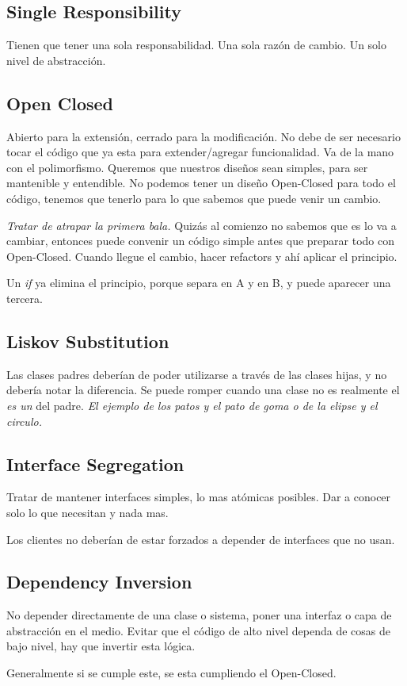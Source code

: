 \subsection*{Single Responsibility}
Tienen que tener una sola responsabilidad. Una sola razón de cambio. Un solo nivel de abstracción.

\subsection*{Open Closed}
Abierto para la extensión, cerrado para la modificación. No debe de ser necesario tocar el código que ya esta para extender/agregar funcionalidad. Va de la mano con el polimorfismo. Queremos que nuestros diseños sean simples, para ser mantenible y entendible.  No podemos tener un diseño Open-Closed para todo el código, tenemos que tenerlo para lo que sabemos que puede venir un cambio.

\textit{Tratar de atrapar la primera bala.} Quizás al comienzo no sabemos que es lo va a cambiar, entonces puede convenir un código simple antes que preparar todo con Open-Closed. Cuando llegue el cambio, hacer refactors y ahí aplicar el principio.

Un \textit{if} ya elimina el principio, porque separa en A y en B, y puede aparecer una tercera.

\subsection*{Liskov Substitution}
Las clases padres deberían de poder utilizarse a través de las clases hijas, y no debería notar la diferencia. Se puede romper cuando una clase no es realmente el \textit{es un} del padre. \textit{El ejemplo de los patos y el pato de goma o de la elipse y el circulo.}

\subsection*{Interface Segregation}
Tratar de mantener interfaces simples, lo mas atómicas posibles. Dar a conocer solo lo que necesitan y nada mas. 

Los clientes no deberían de estar forzados a depender de interfaces que no usan.

\subsection*{Dependency Inversion}

No depender directamente de una clase o sistema, poner una interfaz o capa de abstracción en el medio. Evitar que el código de alto nivel dependa de cosas de bajo nivel, hay que invertir esta lógica.

Generalmente si se cumple este, se esta cumpliendo el Open-Closed.